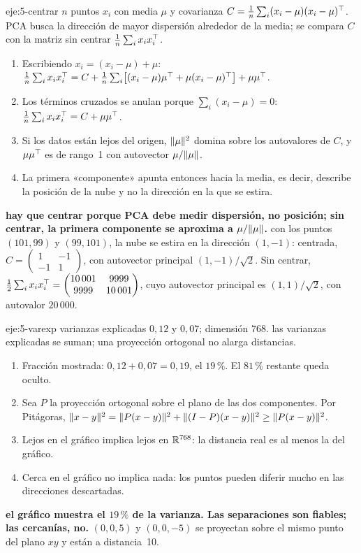 \begin{solucion}{eje:5-centrar}
\datos $n$ puntos $x_i$ con media $\mu$ y covarianza $C=\frac1n\sum_i(x_i-\mu)(x_i-\mu)^{\top}$.
\planteamiento PCA busca la dirección de mayor dispersión alrededor de la media; se compara $C$ con la matriz sin centrar $\frac1n\sum_ix_ix_i^{\top}$.
\pasos
\begin{enumerate}[label=\arabic*.]
  \item Escribiendo $x_i=(x_i-\mu)+\mu$: $\frac1n\sum_ix_ix_i^{\top}=C+\frac1n\sum_i\bigl[(x_i-\mu)\mu^{\top}+\mu(x_i-\mu)^{\top}\bigr]+\mu\mu^{\top}$.
  \item Los términos cruzados se anulan porque $\sum_i(x_i-\mu)=0$: $\frac1n\sum_ix_ix_i^{\top}=C+\mu\mu^{\top}$.
  \item Si los datos están lejos del origen, $\lVert\mu\rVert^{2}$ domina sobre los autovalores de $C$, y $\mu\mu^{\top}$ es de rango~1 con autovector $\mu/\lVert\mu\rVert$.
  \item La primera «componente» apunta entonces hacia la media, es decir, describe la posición de la nube y no la dirección en la que se estira.
\end{enumerate}
\resultado \textbf{hay que centrar porque PCA debe medir dispersión, no posición; sin centrar, la primera componente se aproxima a $\mu/\lVert\mu\rVert$.}
\comprobacion con los puntos $(101,99)$ y $(99,101)$, la nube se estira en la dirección $(1,-1)$: centrada, $C=\begin{pmatrix}1&-1\\-1&1\end{pmatrix}$, con autovector principal $(1,-1)/\sqrt{2}$. Sin centrar, $\frac12\sum_ix_ix_i^{\top}=\begin{pmatrix}10\,001&9999\\9999&10\,001\end{pmatrix}$, cuyo autovector principal es $(1,1)/\sqrt{2}$, con autovalor $20\,000$.
\end{solucion}

\begin{solucion}{eje:5-varexp}
\datos varianzas explicadas $0{,}12$ y $0{,}07$; dimensión $768$.
\planteamiento las varianzas explicadas se suman; una proyección ortogonal no alarga distancias.
\pasos
\begin{enumerate}[label=\arabic*.]
  \item Fracción mostrada: $0{,}12+0{,}07=0{,}19$, el $19\,\%$. El $81\,\%$ restante queda oculto.
  \item Sea $P$ la proyección ortogonal sobre el plano de las dos componentes. Por Pitágoras, $\lVert x-y\rVert^{2}=\lVert P(x-y)\rVert^{2}+\lVert(I-P)(x-y)\rVert^{2}\ge\lVert P(x-y)\rVert^{2}$.
  \item Lejos en el gráfico implica lejos en $\mathbb{R}^{768}$: la distancia real es al menos la del gráfico.
  \item Cerca en el gráfico no implica nada: los puntos pueden diferir mucho en las direcciones descartadas.
\end{enumerate}
\resultado \textbf{el gráfico muestra el $19\,\%$ de la varianza. Las separaciones son fiables; las cercanías, no.}
\comprobacion $(0,0,5)$ y $(0,0,-5)$ se proyectan sobre el mismo punto del plano $xy$ y están a distancia~10.
\end{solucion}

